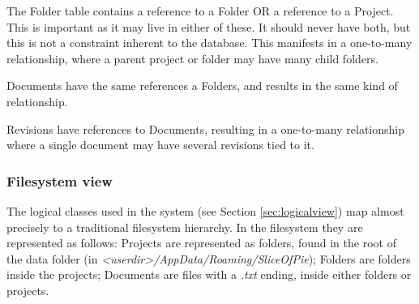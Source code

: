 The Folder table contains a reference to a Folder OR a reference to a Project. This is important as
it may live in either of these. It should never have both, but this is not a constraint inherent to
the database. This manifests in a one-to-many relationship, where a parent project or folder may have
many child folders.

Documents have the same references a Folders, and results in the same kind of relationship.

Revisions have references to Documents, resulting in a one-to-many relationship where a single document
may have several revisions tied to it.

\subsubsection{Filesystem view}
The logical classes used in the system (see Section \ref{sec:logicalview}) map almost precisely to a
traditional filesystem hierarchy. In the filesystem they are represented as follows: Projects are
represented as folders, found in the root of the data folder (in \emph{<userdir>/AppData/Roaming/SliceOfPie});
Folders are folders inside the projects; Documents are files with a \emph{.txt} ending, inside either folders
or projects.
